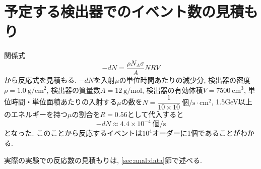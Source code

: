 \section{予定する検出器でのイベント数の見積もり}
関係式
\begin{equation}
    -dN =\dfrac{\rho N_A \sigma }{A}NRV
\end{equation}
から反応式を見積もる.
$-dN$を入射$\mu$の単位時間あたりの減少分, 検出器の密度$\rho = 1.0 \ \mathrm{g/cm^2}$,
検出器の質量数$A = 12 \ \mathrm{g/mol}$, 検出器の有効体積$V = 7500 \ \mathrm{cm^3}$,
単位時間・単位面積あたりの入射する$\mu$の数を$N = \dfrac{1}{10\times 10} \ \mathrm{個/s\cdot cm^2}$,
1.5GeV以上のエネルギーを持つ$\mu$の割合を$R = 0.56$として代入すると
\begin{equation}
    -dN \approx 4.4 \times 10^{-4} \ \mathrm{個/s}
\end{equation}
となった.
このことから反応するイベントは$10^4$オーダーに1個であることがわかる.

実際の実験での反応数の見積もりは, \ref{sec:anal:data}節で述べる.